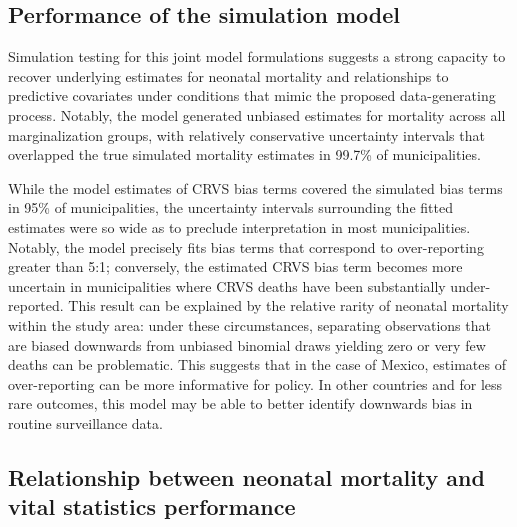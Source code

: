 \documentclass[
]{article}
\begin{document}
\hypertarget{performance-of-the-simulation-model}{%
\subsection{Performance of the simulation model}\label{performance-of-the-simulation-model}}

Simulation testing for this joint model formulations suggests a strong capacity to recover underlying estimates for neonatal mortality and relationships to predictive covariates under conditions that mimic the proposed data-generating process. Notably, the model generated unbiased estimates for mortality across all marginalization groups, with relatively conservative uncertainty intervals that overlapped the true simulated mortality estimates in 99.7\% of municipalities.

While the model estimates of CRVS bias terms covered the simulated bias terms in 95\% of municipalities, the uncertainty intervals surrounding the fitted estimates were so wide as to preclude interpretation in most municipalities. Notably, the model precisely fits bias terms that correspond to over-reporting greater than 5:1; conversely, the estimated CRVS bias term becomes more uncertain in municipalities where CRVS deaths have been substantially under-reported. This result can be explained by the relative rarity of neonatal mortality within the study area: under these circumstances, separating observations that are biased downwards from unbiased binomial draws yielding zero or very few deaths can be problematic. This suggests that in the case of Mexico, estimates of over-reporting can be more informative for policy. In other countries and for less rare outcomes, this model may be able to better identify downwards bias in routine surveillance data.

\hypertarget{relationship-between-neonatal-mortality-and-vital-statistics-performance}{%
\subsection{Relationship between neonatal mortality and vital statistics performance}\label{relationship-between-neonatal-mortality-and-vital-statistics-performance}}
\end{document}
